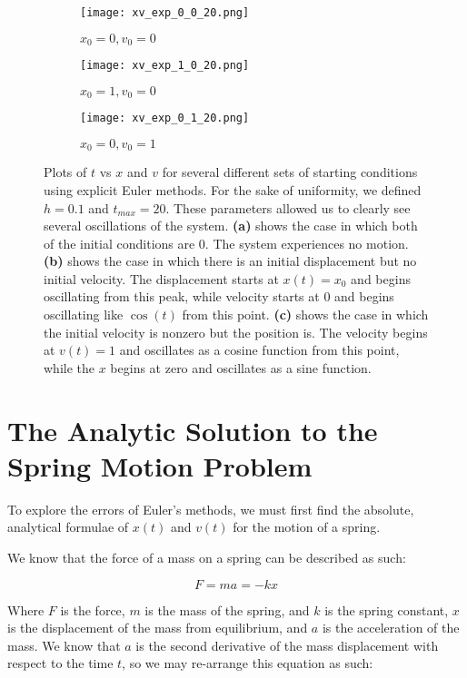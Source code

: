 \documentclass{article}
\begin{document}
\begin{figure}
\centering
\begin{subfigure}{.65\textwidth}
  \centering
  \texttt{[image: xv\_exp\_0\_0\_20.png]}
  \caption{$x_0 = 0, v_0 = 0$}
  \label{fig:sfig1}
\end{subfigure}
\begin{subfigure}{.65\textwidth}
  \centering
  \texttt{[image: xv\_exp\_1\_0\_20.png]}
  \caption{$x_0 = 1, v_0 = 0$}
  \label{fig:sfig2}
\end{subfigure}
\begin{subfigure}{.65\textwidth}
  \centering
  \texttt{[image: xv\_exp\_0\_1\_20.png]}
  \caption{$x_0 = 0, v_0 = 1$}
  \label{fig:sfig3}
\end{subfigure}%
\caption{Plots of $t$ vs $x$ and $v$ for several different sets of starting conditions using explicit Euler methods.  For the sake of uniformity, we defined $h = 0.1$ and $t_{max} = 20$.  These parameters allowed us to clearly see several oscillations of the system.  \textbf{(a)} shows the case in which both of the initial conditions are $0$.  The system experiences no motion.  \textbf{(b)} shows the case in which there is an initial displacement but no initial velocity.  The displacement starts at $x(t) = x_0$ and begins oscillating from this peak, while velocity starts at $0$ and begins oscillating like $\cos(t)$ from this point.  \textbf{(c)} shows the case in which the initial velocity is nonzero but the position is.  The velocity begins at $v(t) = 1$ and oscillates as a cosine function from this point, while the $x$ begins at zero and oscillates as a sine function.}
\label{fig:exp_num_spring}
\end{figure}

\section{The Analytic Solution to the Spring Motion Problem}

To explore the errors of Euler's methods, we must first find the absolute, analytical formulae of $x(t)$ and $v(t)$ for the motion of a spring.

We know that the force of a mass on a spring can be described as such:

\begin{equation}
    F = ma = -kx
\end{equation}

Where $F$ is the force, $m$ is the mass of the spring, and $k$ is the spring constant, $x$ is the displacement of the mass from equilibrium, and $a$ is the acceleration of the mass.  We know that $a$ is the second derivative of the mass displacement with respect to the time $t$, so we may re-arrange this equation as such:
\end{document}
